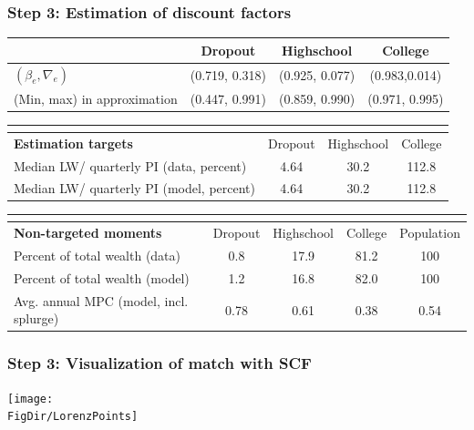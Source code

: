 \documentclass[pdflatex,aspectratio=169]{beamer}
\begin{document}
{        \begin{frame}
          \frametitle{Step 3: Estimation of discount factors}
          \begin{tabular}{lccc}
            & Dropout & Highschool & College \\ \midrule
            $(\beta_e, \nabla_e)$ & (0.719, 0.318) & (0.925, 0.077) & (0.983,0.014) \\
            (Min, max) in approximation & (0.447, 0.991) & (0.859, 0.990) & (0.971, 0.995) \\
            \midrule 
          \end{tabular} 
          \begin{tabular}{lccc}
            \multicolumn{4}{l}{ } \\ \midrule
            \textbf{Estimation targets} & Dropout & Highschool & College \\ \midrule
            Median LW/ quarterly PI (data, percent) & 4.64 & 30.2 & 112.8 \\ 
            Median LW/ quarterly PI (model, percent) & 4.64 & 30.2 & 112.8 %
            \\ \midrule 
          \end{tabular} 
          \begin{tabular}{lcccc}
            \multicolumn{5}{l}{ } \\ \midrule
            \textbf{Non-targeted moments} & Dropout & Highschool & College & Population \\ \midrule
            Percent of total wealth (data) & 0.8 & 17.9 & 81.2 & 100 \\
            Percent of total wealth (model) & 1.2 & 16.8 & 82.0 & 100 \\
            Avg. annual MPC (model, incl. splurge) & 0.78 & 0.61 & 0.38 & 0.54
            \\ \bottomrule 
          \end{tabular}
        \end{frame}




        \begin{frame}
          \frametitle{Step 3: Visualization of match with SCF}
          \centering
          \texttt{[image: \\FigDir/LorenzPoints]}
        \end{frame}


      }{}
\end{document}
